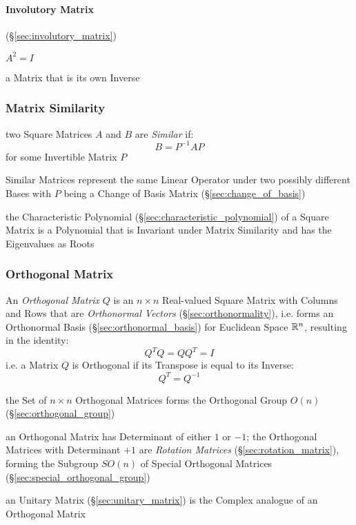 \paragraph{Involutory Matrix} (\S\ref{sec:involutory_matrix})\hfill

$A^2 = I$

a Matrix that is its own Inverse



\subsubsection{Matrix Similarity}\label{sec:matrix_similarity}

two Square Matrices $A$ and $B$ are \emph{Similar} if:
\[
  B = P^{-1}AP
\]
for some Invertible Matrix $P$

Similar Matrices represent the same Linear Operator under two possibly
different Bases with $P$ being a Change of Basis Matrix
(\S\ref{sec:change_of_basis})

the Characteristic Polynomial (\S\ref{sec:characteristic_polynomial}) of a
Square Matrix is a Polynomial that is Invariant under Matrix Similarity and has
the Eigenvalues as Roots



\subsubsection{Orthogonal Matrix}\label{sec:orthogonal_matrix}

An \emph{Orthogonal Matrix} $Q$ is an $n \times n $ Real-valued Square Matrix
with Columns and Rows that are \emph{Orthonormal Vectors}
(\S\ref{sec:orthonormality}), i.e. forms an Orthonormal Basis
(\S\ref{sec:orthonormal_basis}) for Euclidean Space $\mathbb{R}^n$, resulting in
the identity:
\[
  Q^TQ = QQ^T = I
\]
i.e. a Matrix $Q$ is Orthogonal if its Transpose is equal to its Inverse:
\[
  Q^T = Q^{-1}
\]

the Set of $n \times n$ Orthogonal Matrices forms the Orthogonal Group
$O(n)$ (\S\ref{sec:orthogonal_group})

an Orthogonal Matrix has Determinant of either $1$ or $-1$; the Orthogonal
Matrices with Determinant $+1$ are \emph{Rotation Matrices}
(\S\ref{sec:rotation_matrix}), forming the Subgroup $SO(n)$ of Special
Orthogonal Matrices (\S\ref{sec:special_orthogonal_group})

\fist an Unitary Matrix (\S\ref{sec:unitary_matrix}) is the Complex analogue of
an Orthogonal Matrix

